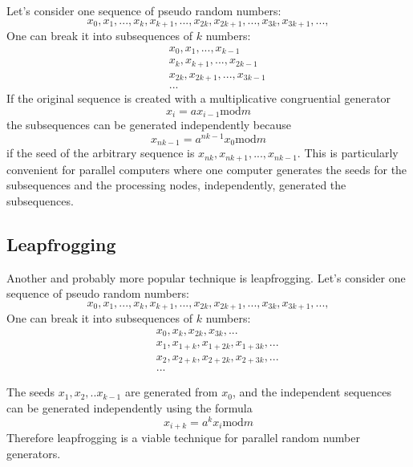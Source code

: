 \documentclass[justified,sixbynine]{tufte-book}
\theoremstyle{plain}%
\theoremstyle{definition}
\theoremstyle{remark}
\begin{document}
\begin{fullwidth}
Let's consider one sequence of pseudo random numbers:
\begin{equation}
x_0,x_1,...,x_k,x_{k+1},...,x_{2k},x_{2k+1},...,x_{3k},x_{3k+1},...,
\end{equation}
One can break it into subsequences of $k$ numbers:
\begin{eqnarray}
&&x_0,x_1,...,x_{k-1} \\
&&x_k,x_{k+1},...,x_{2k-1} \\
&&x_{2k},x_{2k+1},...,x_{3k-1} \\
&&...
\end{eqnarray}
If the original sequence is created with a multiplicative congruential
generator
\begin{equation}
x_i=ax_{i-1}\textrm{mod}m
\end{equation}
the subsequences can be generated independently because
\begin{equation}
x_{nk-1}=a^{nk-1}x_0\textrm{mod}m
\end{equation}
if the seed of the arbitrary sequence is $x_{nk},x_{nk+1},...,x_{nk-1}$. This
is particularly convenient for parallel computers where one computer
generates the seeds for the subsequences and the processing nodes,
independently, generated the subsequences.

\goodbreak\subsection{Leapfrogging}

Another and probably more popular technique is leapfrogging.
Let's consider one sequence of pseudo random numbers:
\begin{equation}
x_0,x_1,...,x_k,x_{k+1},...,x_{2k},x_{2k+1},...,x_{3k},x_{3k+1},...,
\end{equation}
One can break it into subsequences of $k$ numbers:
\begin{eqnarray}
&&x_0,x_k,x_{2k},x_{3k},... \\
&&x_1,x_{1+k},x_{1+2k},x_{1+3k},... \\
&&x_2,x_{2+k},x_{2+2k},x_{2+3k},... \\
&&...
\end{eqnarray}

The seeds $x_1,x_2,..x_{k-1}$ are generated from $x_0$, and the independent
sequences can be generated independently using the formula
\begin{equation}
x_{i+k}=a^kx_i\textrm{mod}m
\end{equation}
Therefore leapfrogging is a viable technique for parallel random number
generators.


\end{fullwidth}
\end{document}
